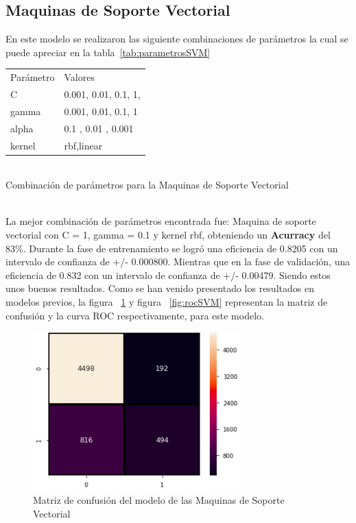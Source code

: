 \documentclass[conference]{IEEEtran}
\begin{document}
\subsection{Maquinas de Soporte Vectorial}\hfill
En este modelo se realizaron las siguiente combinaciones de parámetros la cual se puede apreciar en la tabla~\ref{tab:parametrosSVM} \hfill\\
\begin{table}[H]
\centering
\begin{tabular}{|l|l|}
\hline
Parámetro    & Valores          \\ 
C & 0.001, 0.01, 0.1, 1,        \\ 
gamma    & 0.001, 0.01, 0.1, 1  \\ 
alpha    &  0.1  , 0.01 , 0.001  \\ 
kernel    & rbf,linear   \\ \hline
\end{tabular}\hfill
\end{table} \hfill\\
\caption{Combinación de parámetros para la Maquinas de Soporte Vectorial}
\label{tab:parametrosSVM}\hfill\\
La mejor combinación de parámetros encontrada fue: Maquina de soporte vectorial con C = 1, gamma = 0.1 y kernel rbf, obteniendo un \textbf{Acurracy} del 83\%.
Durante la fase de entrenamiento se logró una eficiencia de 0.8205 con un intervalo de confianza de +/- 0.000800. Mientras que en la fase de validación, una eficiencia de 0.832  con un intervalo de confianza de +/-  0.00479. Siendo estos unos buenos resultados.
Como se han venido presentado los resultados en modelos previos, la figura ~\ref{fig:matrixSVM}  y figura ~\ref{fig:rocSVM} representan la matriz de confusión y la curva ROC respectivamente, para este modelo.
\begin{center}
    \begin{figure}[H]
        \hfill
     \centerline{\includegraphics[width=8cm]{MatrixSVM.png}}
    \caption{Matriz de confusión del modelo de las Maquinas de Soporte Vectorial}
    \label{fig:matrixSVM}
    \end{figure}  
\end{center}
\end{document}
